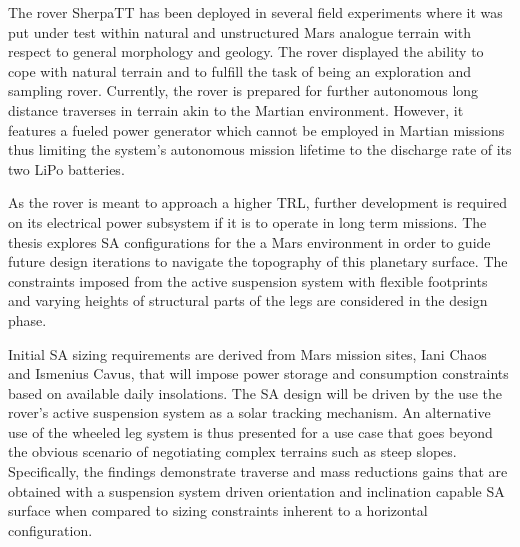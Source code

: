 The rover SherpaTT has been deployed in several field experiments where it was put under test within natural and unstructured Mars analogue terrain with respect to general morphology and geology. The rover displayed the ability to cope with natural terrain and to fulfill the task of being an exploration and sampling rover. Currently, the rover is prepared for further autonomous long distance traverses in terrain akin to the Martian environment. However, it features a fueled power generator which cannot be employed in Martian missions thus limiting the system's autonomous mission lifetime to the discharge rate of its two LiPo batteries.

As the rover is meant to approach a higher \ac{TRL}, further development is required on its electrical power subsystem if it is to operate in long term missions. The thesis explores \ac{SA} configurations for the a Mars environment in order to guide future design iterations to navigate the topography of this planetary surface. The constraints imposed from the active suspension system with flexible footprints and varying heights of structural parts of the legs are considered in the design phase.

Initial \ac{SA} sizing requirements are derived from Mars mission sites, Iani Chaos and Ismenius Cavus, that will impose power storage and consumption constraints based on available daily insolations. The \ac{SA} design will be driven by the use the rover's active suspension system as a solar tracking mechanism. An alternative use of the wheeled leg system is thus presented for a use case that goes beyond the obvious scenario of negotiating complex terrains such as steep slopes. Specifically, the findings demonstrate traverse and mass reductions gains that are obtained with a suspension system driven orientation and inclination capable \ac{SA} surface when compared to sizing constraints inherent to a horizontal configuration.






